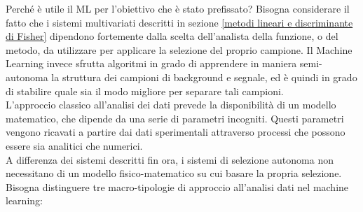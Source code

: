 Perché è utile il ML per l'obiettivo che è stato prefissato? Bisogna considerare il fatto che i sistemi multivariati descritti in sezione \ref{metodi lineari e discriminante di Fisher} dipendono fortemente dalla scelta dell'analista della funzione, o del metodo, da utilizzare per applicare la selezione del proprio campione. Il Machine Learning invece sfrutta algoritmi in grado di apprendere in maniera semi-autonoma la struttura dei campioni di background e segnale, ed è quindi in grado di stabilire quale sia il modo migliore per separare tali campioni. \\
L'approccio classico all'analisi dei dati prevede la disponibilità di un modello matematico, che dipende da una serie di parametri incogniti. Questi parametri vengono ricavati a partire dai dati sperimentali attraverso processi che possono essere sia analitici che numerici. \\
A differenza dei sistemi descritti fin ora, i sistemi di selezione autonoma non necessitano di un modello fisico-matematico su cui basare la propria selezione. \\
Bisogna distinguere tre macro-tipologie di approccio all'analisi dati nel machine learning:
